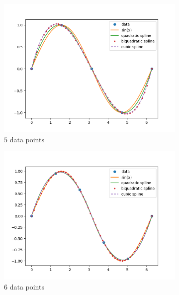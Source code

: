 \documentclass[12pt]{article}
\begin{document}
\begin{figure}[h]
	\begin{subfigure}[h]{0.3\textwidth}
		\centering
		\includegraphics[width=\textwidth]{1cn5.png}
		\caption{$5$ data points}
	\end{subfigure}
	\hfill
	\begin{subfigure}[h]{0.3\textwidth}
		\centering
		\includegraphics[width=\textwidth]{1cn6.png}
		\caption{$6$ data points}
	\end{subfigure}
	\hfill
	\begin{subfigure}[h]{0.3\textwidth}
		\centering

\end{subfigure}
\end{figure}
\end{document}
